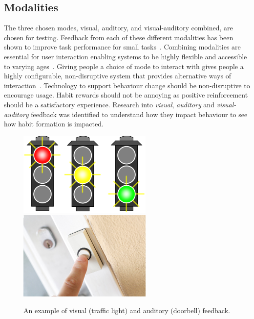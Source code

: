 
\subsection{Modalities}
The three chosen modes, visual, auditory, and visual-auditory combined, are chosen for testing. Feedback from each of these different modalities has been shown to improve task performance for small tasks~\cite{chi_oussama_tap_the_shapetones}. Combining modalities are essential for user interaction enabling systems to be highly flexible and accessible to varying ages~\cite{article_user_centred_multimodal_reminders}. Giving people a choice of mode to interact with gives people a highly configurable, non-disruptive system that provides alternative ways of interaction~\cite{article_designing_multimodal_reminders_for_home, multi_modal_reminders_less_disruptive}. Technology to support behaviour change should be non-disruptive to encourage usage. Habit rewards should not be annoying as positive reinforcement should be a satisfactory experience. Research into \textit{visual}, \textit{auditory} and \textit{visual-auditory} feedback was identified to understand how they impact behaviour to see how habit formation is impacted.

\begin{figure}[H]
  \centering
  \includegraphics[width=2.6in]{../resources/visual.png}
  \hspace{10px}
  \includegraphics[width=2.6in]{../resources/audio.png}
  \caption{An example of visual (traffic light) and auditory (doorbell) feedback.}
  \label{fig:visual_audio}
\end{figure}

